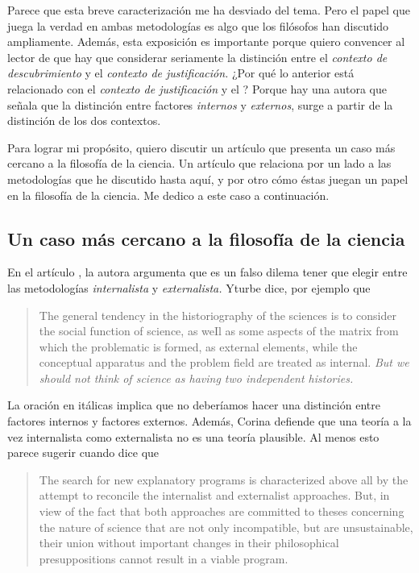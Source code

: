 Parece que esta breve caracterización me ha desviado del tema.
Pero el papel que juega la verdad en ambas metodologías es algo que los filósofos han discutido ampliamente.
Además, esta exposición es importante porque quiero convencer al lector de que hay que considerar seriamente la distinción entre el \emph{contexto de descubrimiento} y el \emph{contexto de justificación.}
¿Por qué lo anterior está relacionado con el \emph{contexto de justificación} y el ?
Porque hay una autora que señala que la distinción entre factores \emph{internos} y \emph{externos}, surge a partir de la distinción de los dos contextos.

Para lograr mi propósito, quiero discutir un artículo que presenta un caso más cercano a la filosofía de la ciencia.
Un artículo que relaciona por un lado a las metodologías que he discutido hasta aquí, y por otro cómo éstas juegan un papel en la filosofía de la ciencia.
Me dedico a este caso a continuación.

\subsection{Un caso más cercano a la filosofía de la ciencia}\label{sbc:yturbe}

\noindent En el artículo , la autora argumenta que es un falso dilema tener que elegir entre las metodologías \emph{internalista} y \emph{externalista.}
Yturbe dice, por ejemplo que

\begin{quote}
	The general tendency in the historiography of the sciences is to consider the social function of science, as weIl as some aspects of the matrix from which the problematic is formed, as external elements, while the conceptual apparatus and the problem field are treated as internal. \emph{But we should not think of science as having two independent histories.} \parencite[p.85, Énfasis agregado]{Yturbe1995}
\end{quote}

La oración en itálicas implica que no deberíamos hacer una distinción entre factores internos y factores externos.
Además, Corina defiende que una teoría a la vez internalista como externalista no es una teoría plausible.
Al menos esto parece sugerir cuando dice que

\begin{quote}
	The search for new explanatory programs is characterized above all by the attempt to reconcile the internalist and externalist approaches.
	But, in view of the fact that both approaches are committed to theses concerning the nature of science that are not only incompatible, but are unsustainable, their union without important changes in their philosophical presuppositions cannot result in a viable program. \parencite[p. 79]{Yturbe1995}
\end{quote}

